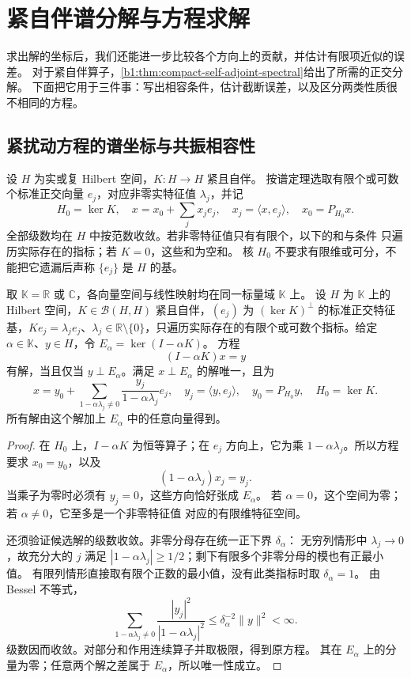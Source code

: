 \section{紧自伴谱分解与方程求解}
\label{b1:sec:C105}

求出解的坐标后，我们还能进一步比较各个方向上的贡献，并估计有限项近似的误差。
对于紧自伴算子，\cref{b1:thm:compact-self-adjoint-spectral}给出了所需的正交分解。
下面把它用于三件事：写出相容条件，估计截断误差，以及区分两类性质很不相同的方程。

\subsection{紧扰动方程的谱坐标与共振相容性}
\label{b1:subsec:C10501}

设 \(H\) 为实或复 Hilbert 空间，\(K:H\rightarrow H\) 紧且自伴。
按谱定理选取有限个或可数个标准正交向量 \(e_j\)，对应非零实特征值 \(\lambda_j\)，并记
\[
 H_0=\ker K,\quad
 x=x_0+\sum_jx_je_j,\quad
 x_j=\langle x,e_j\rangle,\quad x_0=P_{H_0}x.
\]
全部级数均在 \(H\) 中按范数收敛。若非零特征值只有有限个，以下的和与条件
只遍历实际存在的指标；若 \(K=0\)，这些和为空和。
核 \(H_0\) 不要求有限维或可分，不能把它遗漏后声称 \(\{e_j\}\) 是 \(H\) 的基。

\begin{proposition}\label{b1:prop:C1-spectral-solvability}
取 \(\mathbb K=\mathbb R\) 或 \(\mathbb C\)，各向量空间与线性映射均在同一标量域 \(\mathbb K\) 上。
设 \(H\) 为 \(\mathbb K\) 上的 Hilbert 空间，\(K\in\mathcal B(H,H)\) 紧且自伴，\((e_j)\) 为 \((\ker K)^\perp\) 的标准正交特征基，\(Ke_j=\lambda_je_j\)、\(\lambda_j\in\mathbb R\setminus\{0\}\)，只遍历实际存在的有限个或可数个指标。给定 \(\alpha\in\mathbb K\)、\(y\in H\)，令 \(E_\alpha=\ker(I-\alpha K)\)。
方程
\[
 (I-\alpha K)x=y
\]
有解，当且仅当 \(y\perp E_\alpha\)。满足 \(x\perp E_\alpha\) 的解唯一，且为
\[
 x=y_0+
 \sum_{1-\alpha\lambda_j\ne0}
       \frac{y_j}{1-\alpha\lambda_j}e_j,
 \quad y_j=\langle y,e_j\rangle,\quad y_0=P_{H_0}y,\quad H_0=\ker K.
\]
所有解由这个解加上 \(E_\alpha\) 中的任意向量得到。
\end{proposition}
\begin{proof}
在 \(H_0\) 上，\(I-\alpha K\) 为恒等算子；在 \(e_j\) 方向上，它为乘
\(1-\alpha\lambda_j\)。所以方程要求 \(x_0=y_0\)，以及
\[
 (1-\alpha\lambda_j)x_j=y_j.
\]
当乘子为零时必须有 \(y_j=0\)，这些方向恰好张成 \(E_\alpha\)。
若 \(\alpha=0\)，这个空间为零；若 \(\alpha\ne0\)，它至多是一个非零特征值
对应的有限维特征空间。

还须验证候选解的级数收敛。非零分母存在统一正下界 \(\delta_\alpha\)：
无穷列情形中 \(\lambda_j\to0\)，故充分大的 \(j\) 满足
\(|1-\alpha\lambda_j|\geq1/2\)；剩下有限多个非零分母的模也有正最小值。
有限列情形直接取有限个正数的最小值，没有此类指标时取 \(\delta_\alpha=1\)。
由 Bessel 不等式，
\[
 \sum_{1-\alpha\lambda_j\ne0}
 \frac{|y_j|^2}{|1-\alpha\lambda_j|^2}
 \leq\delta_\alpha^{-2}\|y\|^2<\infty.
\]
级数因而收敛。对部分和作用连续算子并取极限，得到原方程。
其在 \(E_\alpha\) 上的分量为零；任意两个解之差属于 \(E_\alpha\)，所以唯一性成立。
\end{proof}

